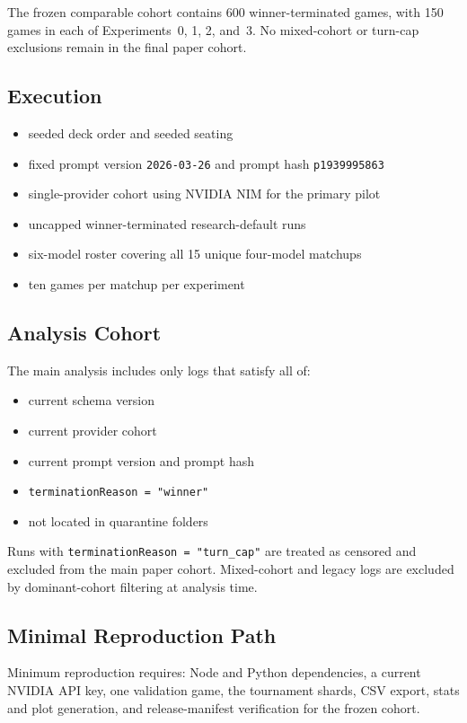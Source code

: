 The frozen comparable cohort contains 600 winner-terminated games, with 150 games in each of Experiments~0, 1, 2, and~3. No mixed-cohort or turn-cap exclusions remain in the final paper cohort.

\subsection{Execution}

\begin{itemize}[leftmargin=1.25em]
  \item seeded deck order and seeded seating
  \item fixed prompt version \texttt{2026-03-26} and prompt hash \texttt{p1939995863}
  \item single-provider cohort using NVIDIA NIM for the primary pilot
  \item uncapped winner-terminated research-default runs
  \item six-model roster covering all 15 unique four-model matchups
  \item ten games per matchup per experiment
\end{itemize}

\subsection{Analysis Cohort}

The main analysis includes only logs that satisfy all of:
\begin{itemize}[leftmargin=1.25em]
  \item current schema version
  \item current provider cohort
  \item current prompt version and prompt hash
  \item \texttt{terminationReason = "winner"}
  \item not located in quarantine folders
\end{itemize}

Runs with \texttt{terminationReason = "turn\_cap"} are treated as censored and excluded from the main paper cohort. Mixed-cohort and legacy logs are excluded by dominant-cohort filtering at analysis time.

\subsection{Minimal Reproduction Path}

Minimum reproduction requires: Node and Python dependencies, a current NVIDIA API key, one validation game, the tournament shards, CSV export, stats and plot generation, and release-manifest verification for the frozen cohort.

